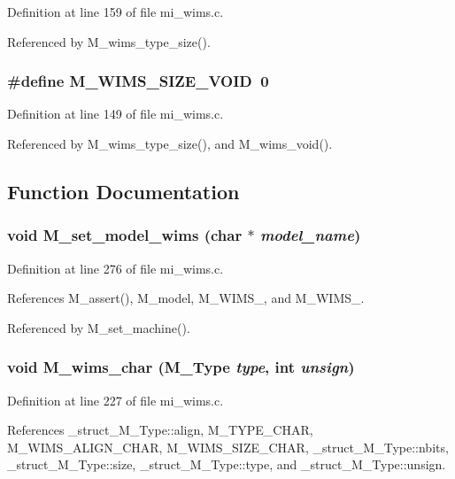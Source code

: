 Definition at line 159 of file mi\_\-wims.c.

Referenced by M\_\-wims\_\-type\_\-size().
\subsubsection{\setlength{\rightskip}{0pt plus 5cm}\#define M\_\-WIMS\_\-SIZE\_\-VOID~0}\label{mi__wims_8c_dab221fb2d9e5375cc1bcee73209b2ea}




Definition at line 149 of file mi\_\-wims.c.

Referenced by M\_\-wims\_\-type\_\-size(), and M\_\-wims\_\-void().

\subsection{Function Documentation}
\subsubsection{\setlength{\rightskip}{0pt plus 5cm}void M\_\-set\_\-model\_\-wims (char $\ast$ {\em model\_\-name})}\label{mi__wims_8c_f36de6117776e46240e25df545776c32}




Definition at line 276 of file mi\_\-wims.c.

References M\_\-assert(), M\_\-model, M\_\-WIMS\_, and M\_\-WIMS\_.

Referenced by M\_\-set\_\-machine().
\subsubsection{\setlength{\rightskip}{0pt plus 5cm}void M\_\-wims\_\-char (\bf{M\_\-Type} {\em type}, int {\em unsign})}\label{mi__wims_8c_ff6a6f98e94463f48ee365e7fd441bd9}




Definition at line 227 of file mi\_\-wims.c.

References \_\-struct\_\-M\_\-Type::align, M\_\-TYPE\_\-CHAR, M\_\-WIMS\_\-ALIGN\_\-CHAR, M\_\-WIMS\_\-SIZE\_\-CHAR, \_\-struct\_\-M\_\-Type::nbits, \_\-struct\_\-M\_\-Type::size, \_\-struct\_\-M\_\-Type::type, and \_\-struct\_\-M\_\-Type::unsign.

